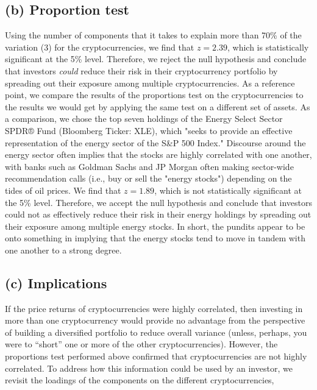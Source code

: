 \documentclass[12pt,twoside]{article}
\begin{document}
\subsection{(b) Proportion test}
Using the number of components that it takes to explain more than 70\% of the variation (3) for the cryptocurrencies, we find that $z=2.39$, which is statistically significant at the 5\% level. Therefore, we reject the null hypothesis and conclude that investors \textit{could} reduce their risk in their cryptocurrency portfolio by spreading out their exposure among multiple cryptocurrencies.
\bigbreak
As a reference point, we compare the results of the proportions test on the cryptocurrencies to the results we would get by applying the same test on a different set of assets. As a comparison, we chose the top seven holdings of the Energy Select Sector SPDR® Fund (Bloomberg Ticker: XLE), which "seeks to provide an effective representation of the energy sector of the S\&P 500 Index."  Discourse around the energy sector often implies that the stocks are highly correlated with one another, with banks such as Goldman Sachs and JP Morgan often making sector-wide recommendation calls (i.e., buy or sell the "energy stocks") depending on the tides of oil prices. We find that $z=1.89$, which is not statistically significant at the 5\% level. Therefore, we accept the null hypothesis and conclude that investors could not as effectively reduce their risk in their energy holdings by spreading out their exposure among multiple energy stocks. In short, the pundits appear to be onto something in implying that the energy stocks tend to move in tandem with one another to a strong degree.

\subsection{(c) Implications}

If the price returns of cryptocurrencies were highly correlated, then investing in more than one cryptocurrency would provide no advantage from the perspective of building a diversified portfolio to reduce overall variance (unless, perhaps, you were to “short” one or more of the other cryptocurrencies). However, the proportions test performed above confirmed that cryptocurrencies are not highly correlated. To address how this information could be used by an investor, we revisit the loadings of the components on the different cryptocurrencies,
\end{document}
